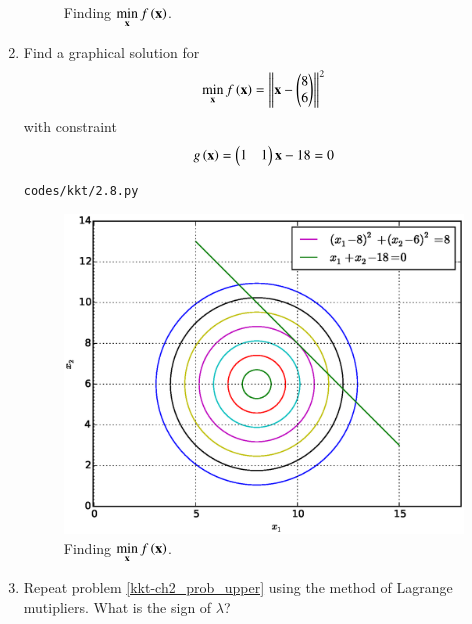 \begin{enumerate}[label=\thesubsection.\arabic*,ref=\thesubsection.\theenumi]
\begin{figure}[!ht]
\caption{ Finding $ \displaystyle \min_{\mathbf{x}}f\left(\mathbf{x}\right)$.}
\label{kkt-fig.2.7}	
\end{figure}
%
\item
\label{kkt-ch2_prob_upper}
Find a graphical solution for 	 
	 \begin{align}
	 \label{kkt-ch2_second_min}
	\min_{\mathbf{x}} f\left(\mathbf{x}\right) = \left\lVert\mathbf{x}-\begin{pmatrix}8\\6\end{pmatrix}\right\rVert^2
	 \end{align}
	 with constraint
	 \begin{align}
	 \label{kkt-ch2_second_const}
	 g\left(\mathbf{x}\right) = \begin{pmatrix}1 & 1\end{pmatrix}\mathbf{x} - 18 = 0
	 \end{align}
	 
%
\solution
%	
\begin{lstlisting}
codes/kkt/2.8.py
\end{lstlisting}

%
\begin{figure}[!ht]
\centering
\includegraphics[width=\columnwidth]{./figs/kkt/2.8.eps}
\caption{ Finding $ \displaystyle \min_{\mathbf{x}}f\left(\mathbf{x}\right)$.}
\label{kkt-fig.2.8}	
\end{figure}
%
\item
Repeat problem \ref{kkt-ch2_prob_upper} using the method of Lagrange mutipliers.  What is the sign of $\lambda$?


\end{enumerate}
